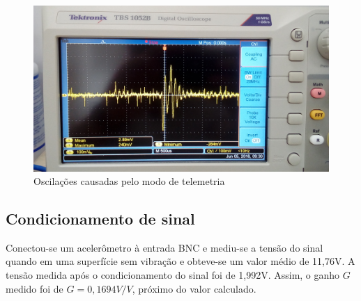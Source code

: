 \documentclass[
	12pt,				%
	openright,			%
	twoside,			%
	a4paper,			%
	english,			%
	french,				%
	spanish,			%
	brazil,				%
	]{abntex2}
\begin{document}
			\begin{figure}[!ht]
				\centering
				\includegraphics[width = \linewidth]{../Fotos/osc33.jpg}
				\caption{Oscilações causadas pelo modo de telemetria}
			\end{figure}

		\subsection{Condicionamento de sinal}
			Conectou-se um acelerômetro à entrada BNC e mediu-se a
			tensão do sinal quando em uma superfície sem vibração e
			obteve-se um valor médio de 11,76V. A tensão medida após o
			condicionamento do sinal foi de 1,992V. Assim, o ganho $G$
			medido foi de $G = 0,1694V/V$, próximo do valor calculado.
\end{document}
